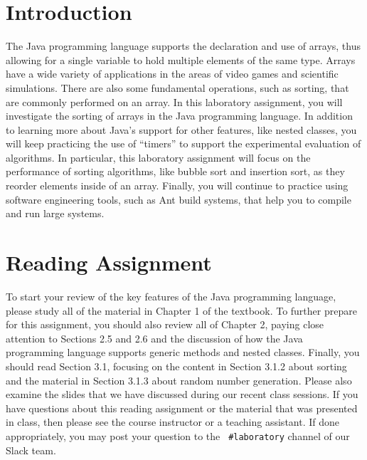 

\usepackage[compact]{titlesec}



\section*{Introduction}

The Java programming language supports the declaration and use of arrays, thus allowing for a single variable to hold
multiple elements of the same type. Arrays have a wide variety of applications in the areas of video games and
scientific simulations. There are also some fundamental operations, such as sorting, that are commonly performed on an
array. In this laboratory assignment, you will investigate the sorting of arrays in the Java programming language.  In
addition to learning more about Java's support for other features, like nested classes, you will keep practicing the use
of ``timers'' to support the experimental evaluation of algorithms. In particular, this laboratory assignment will focus
on the performance of sorting algorithms, like bubble sort and insertion sort, as they reorder elements inside of an
array. Finally, you will continue to practice using software engineering tools, such as Ant build systems, that help you to
compile and run large systems.

\section*{Reading Assignment}

To start your review of the key features of the Java programming language, please study all of the material in Chapter 1
of the textbook. To further prepare for this assignment, you should also review all of Chapter 2, paying close attention
to Sections 2.5 and 2.6 and the discussion of how the Java programming language supports generic methods and nested
classes. Finally, you should read Section 3.1, focusing on the content in Section 3.1.2 about sorting and the material
in Section 3.1.3 about random number generation. Please also examine the slides that we have discussed during our recent
class sessions. If you have questions about this reading assignment or the material that was presented in class, then
please see the course instructor or a teaching assistant. If done appropriately, you may post your question to the {\tt
\#laboratory} channel of our Slack team.

